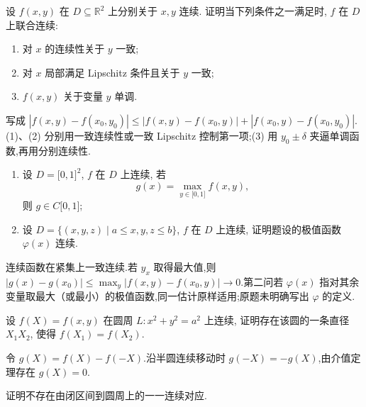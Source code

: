 \begin{example}[\markstar]
    设 $f(x,y)$ 在 $D\subseteq\mathbb{R}^2$ 上分别关于 $x,y$ 连续. 证明当下列条件之一满足时, $f$ 在 $D$ 上联合连续:
    \begin{enumerate}
        \item 对 $x$ 的连续性关于 $y$ 一致;
        \item 对 $x$ 局部满足 Lipschitz 条件且关于 $y$ 一致;
        \item $f(x,y)$ 关于变量 $y$ 单调.
    \end{enumerate}
\end{example}
\exampleblank

\begin{solution}
    写成 $|f(x,y)-f(x_0,y_0)|\leq|f(x,y)-f(x_0,y)|+|f(x_0,y)-f(x_0,y_0)|$.(1)、(2) 分别用一致连续性或一致 Lipschitz 控制第一项;(3) 用 $y_0\pm\delta$ 夹逼单调函数,再用分别连续性.
\end{solution}

\begin{example}[\markstar]
    \begin{enumerate}
        \item 设 $D=\lbrack0,1\rbrack^2$, $f$ 在 $D$ 上连续, 若
              \[
                  g(x)=\max_{y\in\lbrack0,1\rbrack}f(x,y),
              \]
              则 $g\in C\lbrack0,1\rbrack$;
        \item 设 $D=\{(x,y,z)\mid a\leq x,y,z\leq b\}$, $f$ 在 $D$ 上连续, 证明题设的极值函数 $\varphi(x)$ 连续.
    \end{enumerate}
\end{example}
\exampleblank

\begin{solution}
    连续函数在紧集上一致连续.若 $y_x$ 取得最大值,则
    $|g(x)-g(x_0)|\leq\max_y|f(x,y)-f(x_0,y)|\to0$.第二问若 $\varphi(x)$ 指对其余变量取最大（或最小）的极值函数,同一估计原样适用;原题未明确写出 $\varphi$ 的定义.
\end{solution}

\begin{example}
    设 $f(X)=f(x,y)$ 在圆周 $L:x^2+y^2=a^2$ 上连续, 证明存在该圆的一条直径 $X_1X_2$, 使得 $f(X_1)=f(X_2)$.
\end{example}
\exampleblank

\begin{solution}
    令 $g(X)=f(X)-f(-X)$.沿半圆连续移动时 $g(-X)=-g(X)$,由介值定理存在 $g(X)=0$.
\end{solution}

\begin{example}
    证明不存在由闭区间到圆周上的一一连续对应.
\end{example}
\exampleblank

